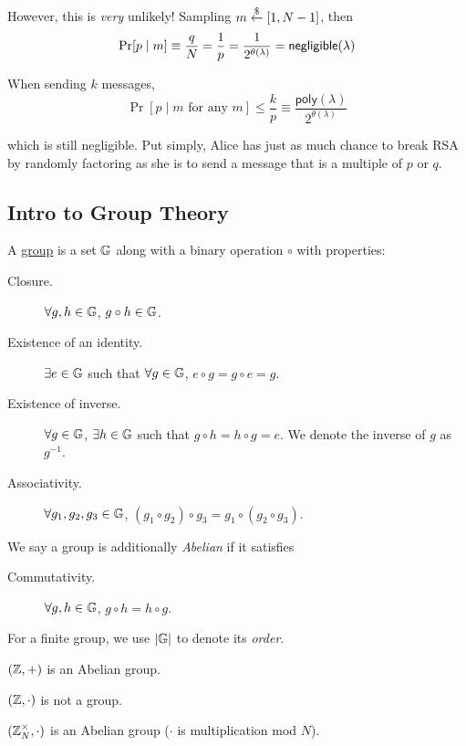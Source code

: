 However, this is \emph{very} unlikely! Sampling $m\overset{\$}{\leftarrow} [1, N-1]$, then
\[\Pr[p\mid m] \equiv \frac{q}{N} = \frac{1}{p} = \frac{1}{2^{\theta(\lambda)}}=\operatorname{\mathsf{negligible}}(\lambda)\]

When sending $k$ messages,
\[\Pr[p\mid m\text{ for any }m] \leq \frac{k}{p} \equiv \frac{\mathsf{poly}(\lambda)}{2^{\theta(\lambda)}}\]

which is still negligible. Put simply, Alice has just as much chance to break RSA by randomly factoring as she is to send a message that is a multiple of $p$ or $q$.

\subsection{Intro to Group Theory}
\begin{definition}[Group]
    A \ul{group} is a set $\mathbb G$ along with a binary operation $\circ$ with properties:
    \begin{description}
        \item[Closure.] $\forall g, h\in \mathbb G$, $g\circ h\in \mathbb G$.
        \item[Existence of an identity.] $\exists e\in \mathbb G$ such that $\forall g\in \mathbb G$, $e\circ g = g\circ e = g$.
        \item[Existence of inverse.] $\forall g\in \mathbb G$, $\exists h\in \mathbb G$ such that $g\circ h = h\circ g = e$. We denote the inverse of $g$ as $g^{-1}$.
        \item[Associativity.] $\forall g_1, g_2, g_3\in \mathbb G$, $(g_1\circ g_2)\circ g_3 = g_1\circ(g_2\circ g_3)$.
    \end{description}

    We say a group is additionally \emph{Abelian} if it satisfies
    \begin{description}
        \item[Commutativity.] $\forall g, h\in \mathbb G$, $g\circ h = h \circ g$.
    \end{description}
    For a finite group, we use $|\mathbb G|$ to denote its \emph{order}.
\end{definition}
\begin{example}

    $(\mathbb Z, +)$ is an Abelian group.

    $(\mathbb Z, \cdot)$ is not a group.

    $(\mathbb Z_N^\times, \cdot)$ is an Abelian group ($\cdot$ is multiplication mod $N$).
\end{example}

